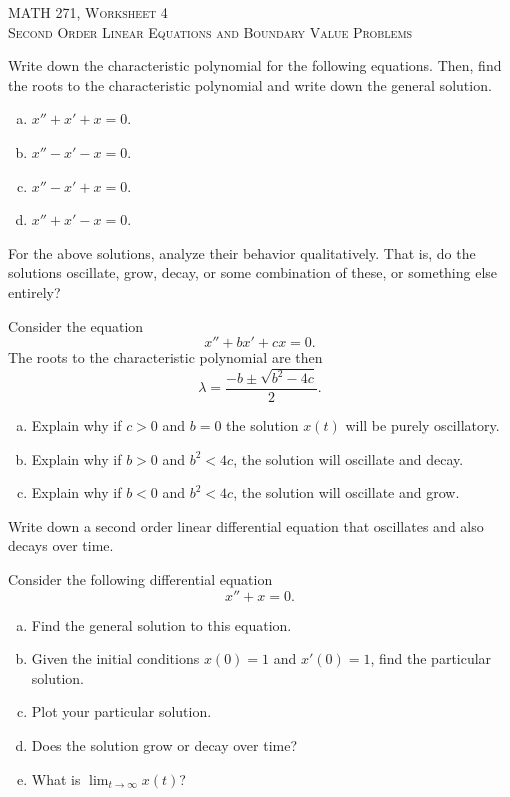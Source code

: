 \documentclass[12pt]{article} %
\begin{document}
\begin{center}
   \textsc{\large MATH 271, Worksheet 4}\\
   \textsc{Second Order Linear Equations and Boundary Value Problems}
\end{center}
\vspace{.5cm}

\begin{problem}
Write down the characteristic polynomial for the following equations.  Then, find the roots to the characteristic polynomial and write down the general solution.
\begin{enumerate}[(a)]
    \item $x''+x'+x=0$.
    \item $x''-x'-x=0$.
    \item $x''-x'+x=0$.
    \item $x''+x'-x=0$.
\end{enumerate}
\end{problem}

\begin{problem}
For the above solutions, analyze their behavior qualitatively. That is, do the solutions oscillate, grow, decay, or some combination of these, or something else entirely?
\end{problem}

\begin{problem}
Consider the equation
\[
x''+bx'+cx=0.
\]
The roots to the characteristic polynomial are then
\[
\lambda = \frac{-b\pm \sqrt{b^2-4c}}{2}.
\]
\begin{enumerate}[(a)]
    \item Explain why if $c>0$ and $b=0$ the solution $x(t)$ will be purely oscillatory.
    \item Explain why if $b>0$ and $b^2<4c$, the solution will oscillate and decay.
    \item Explain why if $b<0$ and $b^2<4c$, the solution will oscillate and grow.
\end{enumerate}
\end{problem}

\begin{problem}
Write down a second order linear differential equation that oscillates and also decays over time.
\end{problem}

\begin{problem}
Consider the following differential equation
\[
x''+x=0.
\]
\begin{enumerate}[(a)]
    \item Find the general solution to this equation.
    \item Given the initial conditions $x(0)=1$ and $x'(0)=1$, find the particular solution.
    \item Plot your particular solution.
    \item Does the solution grow or decay over time? 
    \item What is $\lim_{t\to \infty}x(t)$?
\end{enumerate}

\end{problem}
\end{document}
